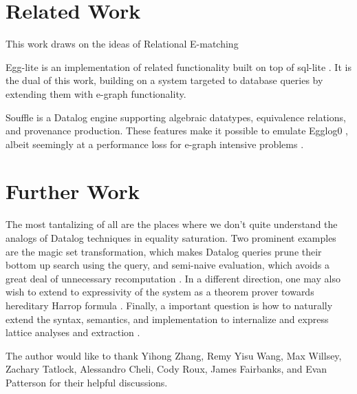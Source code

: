 \documentclass[sigplan,10pt,review]{acmart} %
\begin{document}
\section{Related Work}
This work draws on the ideas of Relational E-matching \cite{rel_ematch}

Egg-lite is an implementation of related functionality built on top of sql-lite \cite{egg-lite}. It is the dual of this work, building on a system targeted to database queries by extending them with e-graph functionality.

Souffle\cite{souffle} is a Datalog engine supporting algebraic datatypes, equivalence relations, and provenance production. These features make it possible to emulate Egglog0 \cite{naivesouffle}, albeit seemingly at a performance loss for e-graph intensive problems \cite{soufflehack}.

\section{Further Work}
The most tantalizing of all are the places where we don't quite understand the analogs of Datalog techniques in equality saturation.
Two prominent examples are the magic set transformation, which makes Datalog queries prune their bottom up search using the query, and semi-naive evaluation, which avoids a great deal of unnecessary recomputation \cite{databases}.
In a different direction, one may also wish to extend to expressivity of the system as a theorem prover towards hereditary Harrop formula \cite{miller_nadathur_2012}.
Finally, a important question is how to naturally extend the syntax, semantics, and implementation to internalize and express lattice analyses and extraction \cite{egg}.

\begin{acks}                            %
The author would like to thank Yihong Zhang, Remy Yisu Wang, Max Willsey, Zachary Tatlock, Alessandro Cheli, Cody Roux, James Fairbanks, and Evan Patterson for their helpful discussions.
\end{acks}






\end{document}
